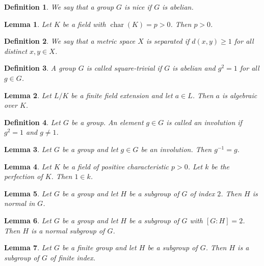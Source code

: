 \documentclass{article}
\newtheorem{lemma}{Lemma}
\newtheorem{definition}{Definition}
\begin{document}
\begin{definition}\label{nice}
We say that a group $G$ is \emph{nice} if $G$ is abelian.
\end{definition}

\begin{lemma}\label{char-hypothesis}
Let $K$ be a field with $\operatorname{char}(K)=p>0$. Then $p>0$.
\end{lemma}

\begin{definition}\label{separated}
We say that a metric space $X$ is \emph{separated} if $d(x,y)\ge1$ for all distinct $x,y\in X$.
\end{definition}

\begin{definition}\label{exponent-two-group}
A group $G$ is called \emph{square-trivial} if $G$ is abelian and $g^2=1$ for all $g\in G$.
\end{definition}

\begin{lemma}\label{finite-algebraic}
Let $L/K$ be a finite field extension and let $a\in L$. Then $a$ is algebraic over $K$.
\end{lemma}

\begin{definition}\label{involution}
Let $G$ be a group. An element $g\in G$ is called an \emph{involution} if $g^2=1$ and $g\neq1$.
\end{definition}

\begin{lemma}\label{involution-inverse}
Let $G$ be a group and let $g\in G$ be an involution. Then $g^{-1}=g$.
\end{lemma}

\begin{lemma}\label{perfection}
Let $K$ be a field of positive characteristic $p>0$. Let $k$ be the perfection of $K$. Then $1\in k$.
\end{lemma}

\begin{lemma}\label{index-two}
Let $G$ be a group and let $H$ be a subgroup of $G$ of index $2$. Then $H$ is normal in $G$.
\end{lemma}

\begin{lemma}\label{index-bracket}
Let $G$ be a group and let $H$ be a subgroup of $G$ with $[G:H]=2$. Then $H$ is a normal subgroup of $G$.
\end{lemma}

\begin{lemma}\label{finite-index}
Let $G$ be a finite group and let $H$ be a subgroup of $G$. Then $H$ is a subgroup of $G$ of finite index.
\end{lemma}
\end{document}

